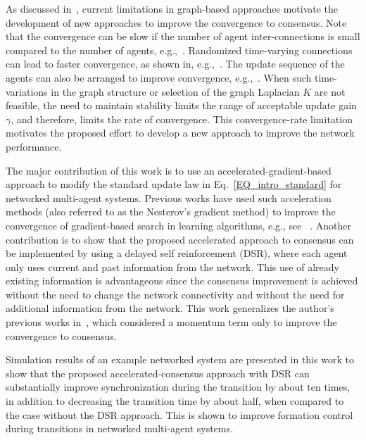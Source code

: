 \documentclass[conference]{IEEEtran}
\begin{document}
\vspace{0.1in}
As discussed in~\cite{Devasia_2019_ICC}, current limitations in graph-based approaches motivate the development of  new approaches to improve the convergence to consensus. Note that the convergence can  be slow if the number of agent inter-connections is small compared to the number of agents, e.g.,~\cite{Carli_08}. 
Randomized time-varying connections can lead to faster convergence, as shown in,   e.g.,~\cite{Carli_08}. The update sequence  of the agents can also be arranged to improve convergence, e.g.,~\cite{Fanti_15}.
When such time-variations in the graph structure or selection of the graph Laplacian $K$ are not feasible, 
the need to maintain stability 
limits the range of acceptable update gain $\gamma$, and therefore, 
limits the rate of convergence. 
This convergence-rate limitation motivates the proposed effort to develop a new approach to improve the network performance. 


\vspace{0.1in}
The major contribution of this work is to use an accelerated-gradient-based approach to modify the standard
update law in Eq.~\eqref{EQ_intro_standard} for networked multi-agent systems. Previous works have used such acceleration methods (also referred to as the Nesterov's gradient method) to improve the convergence of gradient-based search in learning algorithms, e.g., see 
~\cite{Rumelhart_86,QIAN1999145}.
Another contribution is to show that the proposed 
accelerated approach to consensus  can be implemented by 
using a delayed self reinforcement (DSR), 
where each agent only uses 
current and past information from the network. 
This use of already existing information is advantageous since the 
consensus improvement is achieved without the need to change the network connectivity 
and without the need for additional information from the network. 
This work generalizes the author's previous works in~\cite{Devasia_2019_ICC,devasia_19_arXiv,Devasia_2018_DSCC}, which considered a 
momentum term only to improve the convergence to consensus. 

\newpage
\vspace{0.1in}
Simulation results of an example networked system are presented in this work to show  
that the proposed accelerated-consensus approach with DSR can substantially improve synchronization during the transition by about ten times, in addition 
to decreasing the transition time by about half, 
when compared to the case without the DSR approach.
This is shown to improve formation control during transitions in networked 
multi-agent systems.
\end{document}
